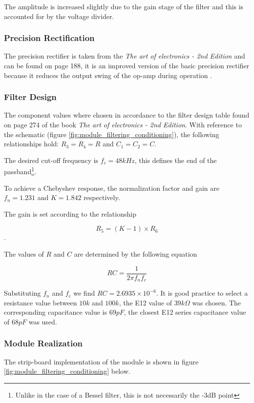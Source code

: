 The amplitude is increased slightly due to the gain stage of the filter and this is accounted for by the voltage divider.

\subsubsection{Precision Rectification}

The precision rectifier is taken from the \textit{The art of electronics - 2nd Edition} and can be found on page 188, it is an improved version of the basic precision rectifier because it reduces the output swing of the op-amp during operation \cite{Horowitz1995}.

\subsubsection{Filter Design}

The component values where chosen in accordance to the filter design table found on page 274 of the book \textit{The art of electronics - 2nd Edition}\cite{Horowitz1995}. With reference to the schematic (figure \ref{fig:module_filtering_conditioning}), the following relationships hold: \(R_3 = R_4 = R\) and \(C_1 = C_2 = C\).

The desired cut-off frequency is \(f_{c} = 48kHz\), this defines the end of the passband\footnote{Unlike in the case of a Bessel filter, this is not necessarily the -3dB point}.

To achieve a Chebyshev response, the normalization factor and gain are \(f_n = 1.231\) and \(K = 1.842\) respectively.

The gain is set according to the relationship

\[R_5 = (K - 1) \times R_6\].

The values of $R$ and $C$ are determined by the following equation

\[RC = \frac{1}{2\pi f_n f_c}\]

Substituting $f_n$ and $f_c$ we find $RC = 2.6935\times 10^{-6}$. It is good practice to select a resistance value between $10k$ and $100k$, the E12 value of $39k\Omega$ was chosen. The corresponding capacitance value is $69pF$, the closest E12 series capacitance value of $68pF$ was used.


\subsubsection{Module Realization}
The strip-board implementation of the module is shown in figure \ref{fig:module_filtering_conditioning} below.

